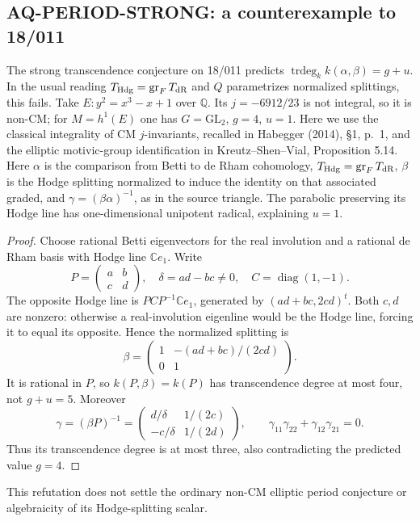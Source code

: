 \subsection{AQ-PERIOD-STRONG: a counterexample to 18/011}
The strong transcendence conjecture on 18/011 predicts
$\operatorname{trdeg}_k k(\alpha,\beta)=g+u$.
In the usual reading $T_{\rm Hdg}=\operatorname{gr}_F T_{\rm dR}$
and $Q$ parametrizes normalized splittings, this fails.
Take $E:y^2=x^3-x+1$ over $\mathbb Q$.
Its $j=-6912/23$ is not integral, so it is non-CM;
for $M=h^1(E)$ one has $G=\mathrm{GL}_2$, $g=4$, $u=1$.
Here we use the classical integrality of CM
$j$-invariants, recalled in Habegger (2014),
\S1, p.~1, and the elliptic motivic-group
identification in Kreutz--Shen--Vial,
Proposition 5.14.
Here $\alpha$ is the comparison from Betti to de Rham
cohomology, $T_{\rm Hdg}=\operatorname{gr}_F T_{\rm dR}$,
$\beta$ is the Hodge splitting normalized to induce the
identity on that associated graded, and
$\gamma=(\beta\alpha)^{-1}$, as in the source triangle.
The parabolic preserving its Hodge line has
one-dimensional unipotent radical, explaining $u=1$.
\begin{proof}
Choose rational Betti eigenvectors for the real involution
and a rational de Rham basis with Hodge line $\mathbb Ce_1$.
Write
\[
 P=\begin{pmatrix}a&b\\c&d\end{pmatrix},\quad
 \delta=ad-bc\ne0,\quad C=\operatorname{diag}(1,-1).
\]
The opposite Hodge line is $PCP^{-1}\mathbb Ce_1$,
generated by $(ad+bc,2cd)^t$. Both $c,d$ are nonzero:
otherwise a real-involution eigenline would be the
Hodge line, forcing it to equal its opposite.
Hence the normalized splitting is
\[
 \beta=\begin{pmatrix}1&-(ad+bc)/(2cd)\\0&1\end{pmatrix}.
\]
It is rational in $P$, so $k(P,\beta)=k(P)$ has
transcendence degree at most four, not $g+u=5$.
Moreover
\[
 \gamma=(\beta P)^{-1}
 =\begin{pmatrix}d/\delta&1/(2c)\\-c/\delta&1/(2d)\end{pmatrix},
 \qquad \gamma_{11}\gamma_{22}+\gamma_{12}\gamma_{21}=0.
\]
Thus its transcendence degree is at most three,
also contradicting the predicted value $g=4$.
\end{proof}
This refutation does not settle the ordinary non-CM
elliptic period conjecture or algebraicity of its
Hodge-splitting scalar.

